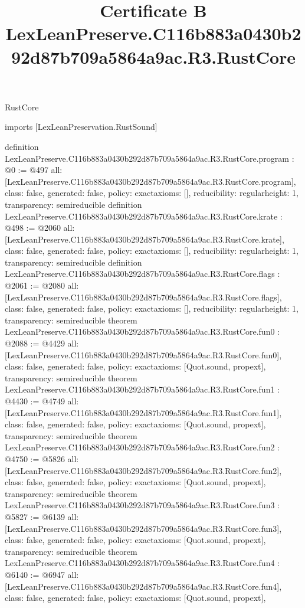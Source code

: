 \begin{lexlean}{RustCore}
\title{Certificate B LexLeanPreserve.C116b883a0430b292d87b709a5864a9ac.R3.RustCore}
\begin{coremodule}
imports [LexLeanPreservation.RustSound]

definition LexLeanPreserve.C116b883a0430b292d87b709a5864a9ac.R3.RustCore.program : @0 := @497 {
  all: [LexLeanPreserve.C116b883a0430b292d87b709a5864a9ac.R3.RustCore.program],
  class: false,
  generated: false,
  policy: exact{axioms: []},
  reducibility: regular{height: 1},
  transparency: semireducible
}
definition LexLeanPreserve.C116b883a0430b292d87b709a5864a9ac.R3.RustCore.krate : @498 := @2060 {
  all: [LexLeanPreserve.C116b883a0430b292d87b709a5864a9ac.R3.RustCore.krate],
  class: false,
  generated: false,
  policy: exact{axioms: []},
  reducibility: regular{height: 1},
  transparency: semireducible
}
definition LexLeanPreserve.C116b883a0430b292d87b709a5864a9ac.R3.RustCore.flags : @2061 := @2080 {
  all: [LexLeanPreserve.C116b883a0430b292d87b709a5864a9ac.R3.RustCore.flags],
  class: false,
  generated: false,
  policy: exact{axioms: []},
  reducibility: regular{height: 1},
  transparency: semireducible
}
theorem LexLeanPreserve.C116b883a0430b292d87b709a5864a9ac.R3.RustCore.fun0 : @2088 := @4429 {
  all: [LexLeanPreserve.C116b883a0430b292d87b709a5864a9ac.R3.RustCore.fun0],
  class: false,
  generated: false,
  policy: exact{axioms: [Quot.sound, propext]},
  transparency: semireducible
}
theorem LexLeanPreserve.C116b883a0430b292d87b709a5864a9ac.R3.RustCore.fun1 : @4430 := @4749 {
  all: [LexLeanPreserve.C116b883a0430b292d87b709a5864a9ac.R3.RustCore.fun1],
  class: false,
  generated: false,
  policy: exact{axioms: [Quot.sound, propext]},
  transparency: semireducible
}
theorem LexLeanPreserve.C116b883a0430b292d87b709a5864a9ac.R3.RustCore.fun2 : @4750 := @5826 {
  all: [LexLeanPreserve.C116b883a0430b292d87b709a5864a9ac.R3.RustCore.fun2],
  class: false,
  generated: false,
  policy: exact{axioms: [Quot.sound, propext]},
  transparency: semireducible
}
theorem LexLeanPreserve.C116b883a0430b292d87b709a5864a9ac.R3.RustCore.fun3 : @5827 := @6139 {
  all: [LexLeanPreserve.C116b883a0430b292d87b709a5864a9ac.R3.RustCore.fun3],
  class: false,
  generated: false,
  policy: exact{axioms: [Quot.sound, propext]},
  transparency: semireducible
}
theorem LexLeanPreserve.C116b883a0430b292d87b709a5864a9ac.R3.RustCore.fun4 : @6140 := @6947 {
  all: [LexLeanPreserve.C116b883a0430b292d87b709a5864a9ac.R3.RustCore.fun4],
  class: false,
  generated: false,
  policy: exact{axioms: [Quot.sound, propext]},
}
\end{coremodule}
\end{lexlean}
